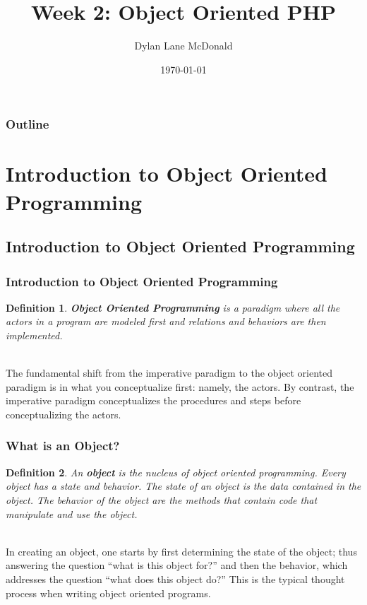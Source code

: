 \documentclass[aspectratio=169]{beamer}
\title{Week 2: Object Oriented PHP}
\author{Dylan Lane McDonald}
\institute{CNM STEMulus Center\\Web Development with PHP}
\date{\today}
\newtheorem{defn}{Definition}
\begin{document}
\lstset{language=Java}
\begin{frame}
\titlepage
\end{frame}

\begin{frame}
\frametitle{Outline}
\tableofcontents
\end{frame}

\section{Introduction to Object Oriented Programming}
\subsection{Introduction to Object Oriented Programming}
\begin{frame}
\frametitle{Introduction to Object Oriented Programming}
\begin{defn}
\textbf{Object Oriented Programming} is a paradigm where all the actors in a program are modeled first and relations and behaviors are then implemented.
\end{defn}

\pause
\mbox{}\\
The fundamental shift from the imperative paradigm to the object oriented paradigm is in what you conceptualize first: namely, the actors. By contrast, the imperative paradigm conceptualizes the procedures and steps before conceptualizing the actors.
\end{frame}

\begin{frame}
\frametitle{What is an Object?}
\begin{defn}
An \textbf{object} is the nucleus of object oriented programming. Every object has a \emph{state} and \emph{behavior}. The state of an object is the data contained in the object. The behavior of the object are the \emph{methods} that contain code that manipulate and use the object.
\end{defn}

\pause
\mbox{}\\
In creating an object, one starts by first determining the state of the object; thus answering the question ``what is this object for?'' and then the behavior, which addresses the question ``what does this object do?'' This is the typical thought process when writing object oriented programs.
\end{frame}
\end{document}
